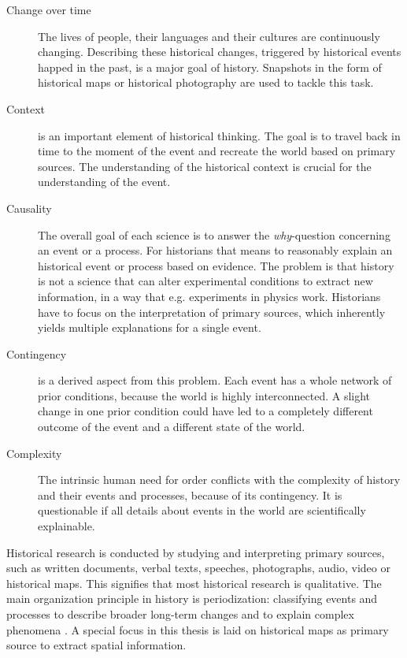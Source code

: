\vspace{-1em}
\begin{description} %
  \item[Change over time]
  The lives of people, their languages and their cultures are continuously changing. Describing these historical changes, triggered by historical events happed in the past, is a major goal of history. Snapshots in the form of historical maps or historical photography are used to tackle this task.
  \item[Context]
  is an important element of historical thinking. The goal is to travel back in time to the moment of the event and recreate the world based on primary sources. The understanding of the historical context is crucial for the understanding of the event.
  \item[Causality]
  The overall goal of each science is to answer the \emph{why}-question concerning an event or a process. For historians that means to reasonably explain an historical event or process based on evidence. The problem is that history is not a science that can alter experimental conditions to extract new information, in a way that e.g. experiments in physics work. Historians have to focus on the interpretation of primary sources, which inherently yields multiple explanations for a single event.
  \item[Contingency]
  is a derived aspect from this problem. Each event has a whole network of prior conditions, because the world is highly interconnected. A slight change in one prior condition could have led to a completely different outcome of the event and a different state of the world.
  \item[Complexity]
  The intrinsic human need for order conflicts with the complexity of history and their events and processes, because of its contingency. It is questionable if all details about events in the world are scientifically explainable.
\end{description}

Historical research is conducted by studying and interpreting primary sources, such as written documents, verbal texts, speeches, photographs, audio, video or historical maps. This signifies that most historical research is qualitative. The main organization principle in history is periodization: classifying events and processes to describe broader long-term changes and to explain complex phenomena
\cite[pp.4-7]{knowles2008placing}.
A special focus in this thesis is laid on historical maps as primary source to extract spatial information.

